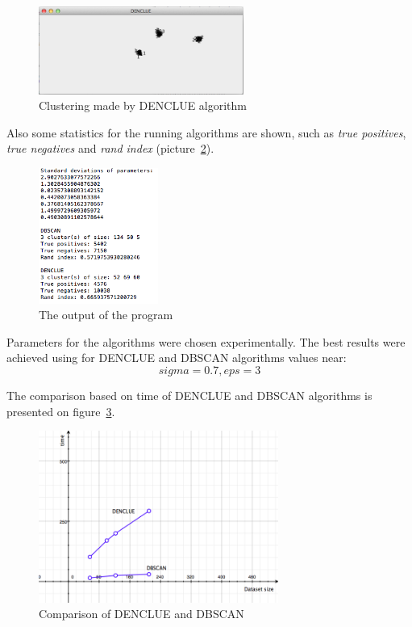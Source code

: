 \documentclass[12pt, a4paper, notitlepage, oneside]{article}
\begin{document}
\begin{figure}[!ht]
 	\centering
	\includegraphics[width=0.6\textwidth]{images/denclue.png}
 	\caption[]
	{Clustering made by DENCLUE algorithm}
		\label{denclue}
	\end{figure}

Also some statistics for the running algorithms are shown, such as \textit{true positives}, \textit{true negatives} and \textit{rand index} (picture~\ref{result}).

\begin{figure}[!ht]
 	\centering
	\includegraphics[width=0.35\textwidth]{images/results.png}
 	\caption[]
	{The output of the program}
		\label{result}
\end{figure}

Parameters for the algorithms were chosen experimentally. The best results were achieved using for DENCLUE and DBSCAN algorithms values near: 
$$sigma = 0.7, eps = 3$$

The comparison based on time of DENCLUE and DBSCAN algorithms is presented on figure~\ref{comparison_time}.

\begin{figure}[!ht]
 	\centering
	\includegraphics[width=0.7\textwidth]{images/comparison_time.png}
 	\caption[]
	{Comparison of DENCLUE and DBSCAN}
		\label{comparison_time}
\end{figure}
\end{document}
